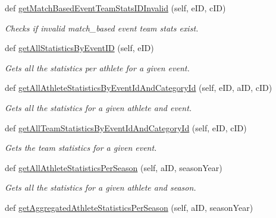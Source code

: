 \begin{DoxyCompactItemize}
def \hyperlink{classhandler_1_1dao_1_1match__based__event__dao_1_1_match_based_event_d_a_o_ae3ede989233ef64dcd4afc02b3f9d6bc}{get\+Match\+Based\+Event\+Team\+Stats\+I\+D\+Invalid} (self, e\+ID, c\+ID)
\begin{DoxyCompactList}\small\item\em Checks if invalid match\+\_\+based event team stats exist. \end{DoxyCompactList}\item 
def \hyperlink{classhandler_1_1dao_1_1match__based__event__dao_1_1_match_based_event_d_a_o_a04d43f14b2e7d75890f5733d4cd3f936}{get\+All\+Statistics\+By\+Event\+ID} (self, e\+ID)
\begin{DoxyCompactList}\small\item\em Gets all the statistics per athlete for a given event. \end{DoxyCompactList}\item 
def \hyperlink{classhandler_1_1dao_1_1match__based__event__dao_1_1_match_based_event_d_a_o_aea8381bb1ffa889c35e082fb1819be03}{get\+All\+Athlete\+Statistics\+By\+Event\+Id\+And\+Category\+Id} (self, e\+ID, a\+ID, c\+ID)
\begin{DoxyCompactList}\small\item\em Gets all the statistics for a given athlete and event. \end{DoxyCompactList}\item 
def \hyperlink{classhandler_1_1dao_1_1match__based__event__dao_1_1_match_based_event_d_a_o_ace06bcd3f219262edd5fa24419df4139}{get\+All\+Team\+Statistics\+By\+Event\+Id\+And\+Category\+Id} (self, e\+ID, c\+ID)
\begin{DoxyCompactList}\small\item\em Gets the team statistics for a given event. \end{DoxyCompactList}\item 
def \hyperlink{classhandler_1_1dao_1_1match__based__event__dao_1_1_match_based_event_d_a_o_adbff96cf6fd1062f71673dfd90f78e48}{get\+All\+Athlete\+Statistics\+Per\+Season} (self, a\+ID, season\+Year)
\begin{DoxyCompactList}\small\item\em Gets all the statistics for a given athlete and season. \end{DoxyCompactList}\item 
def \hyperlink{classhandler_1_1dao_1_1match__based__event__dao_1_1_match_based_event_d_a_o_a2bed0763d424720ba51c10d714252720}{get\+Aggregated\+Athlete\+Statistics\+Per\+Season} (self, a\+ID, season\+Year)

\end{DoxyCompactItemize}
